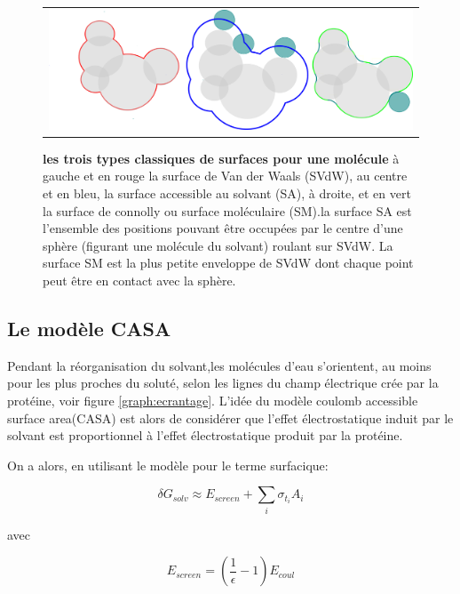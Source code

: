    \begin{figure}[!htbp]
     \centering
     \begin{tabular}{c}
       \includegraphics[width=12cm]{figure/surface.png} &
     \end{tabular}
     
     \caption{\textbf{les trois types classiques de surfaces pour une molécule} à gauche et en rouge la surface de Van der Waals (SVdW), au centre et en bleu, la surface accessible au solvant (SA), à droite, et en vert  la surface de connolly ou surface moléculaire (SM).la surface SA est l'ensemble des positions pouvant être occupées par le centre d'une sphère (figurant une molécule du solvant) roulant sur SVdW. La surface SM est la plus petite enveloppe de SVdW dont chaque point peut être en contact avec la sphère. } 
\label{graph:surface}
   \end{figure}
   

\subsection{Le modèle CASA}
\label{sub:CASA}
Pendant la réorganisation du solvant,les molécules d'eau s'orientent, au moins pour les plus proches du soluté, selon les lignes du champ électrique crée par la protéine, voir figure \ref{graph:ecrantage}. L'idée du modèle \og coulomb accessible surface area\fg (CASA) est alors de considérer que l'effet électrostatique induit par le solvant est proportionnel à l'effet électrostatique produit par la protéine. 

On a  alors, en utilisant le modèle  pour le terme surfacique:

\begin{equation}
\delta G_{solv} \approx E_{screen} + \sum_i \sigma_{t_i} A_i
\end{equation}

avec 

\begin{equation}
E_{screen} =  (\frac{1}{\epsilon} -1 )E_{coul}
\end{equation}

